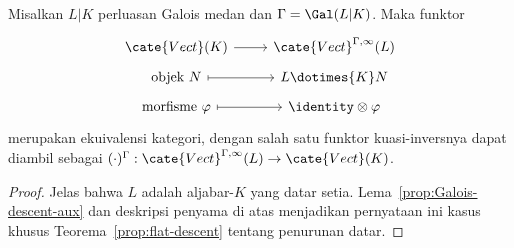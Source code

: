 \begin{theorem}\label{prop:Galois-descent}
	Misalkan $L|K$ perluasan Galois medan dan
	$\Gamma=\Gal(L|K)$. Maka funktor
	\[\begin{tikzcd}[row sep=tiny]
		\cate{Vect}(K) \arrow[r] & \cate{Vect}^{\Gamma, \infty}(L) \\
		\text{objek } N \arrow[mapsto, r] & L \dotimes{K} N \\
		\text{morfisme } \varphi \arrow[mapsto, r] & \identity \otimes \varphi
	\end{tikzcd}\]
	merupakan ekuivalensi kategori, dengan salah satu funktor kuasi-inversnya
	dapat diambil sebagai
	$(\mathord\cdot)^\Gamma:\cate{Vect}^{\Gamma,\infty}(L)
	\to\cate{Vect}(K)$.
\end{theorem}
\begin{proof}
	Jelas bahwa $L$ adalah aljabar-$K$ yang datar setia.
	Lema~\ref{prop:Galois-descent-aux} dan deskripsi penyama di atas
	menjadikan pernyataan ini kasus khusus Teorema~\ref{prop:flat-descent}
	tentang penurunan datar.
\end{proof}


